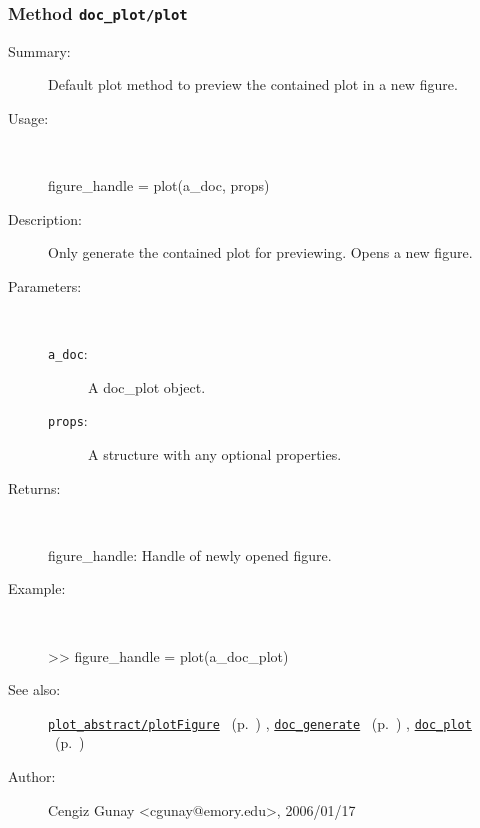 \subsubsection[Method \texttt{plot}]{Method \texttt{doc\_plot/plot}}%
%
\label{ref_doc_plot__plot}%
\hypertarget{ref_doc_plot__plot}{}%
\begin{description}
\item[Summary:]Default plot method to preview the contained plot in a new figure.
%
\item[Usage:]~%
\begin{lyxcode}%
figure\_handle = plot(a\_doc, props)
%
\end{lyxcode}%
%
\item[Description:]%
Only generate the contained plot for previewing. Opens a new figure.
\item[Parameters:]~
\begin{description}%
\item[\texttt{a\_doc}:]
 A doc\_plot object.
\item[\texttt{props}:]
 A structure with any optional properties.
\end{description}%
%
\item[Returns:
]~

	figure\_handle: Handle of newly opened figure.
%
\item[Example:]~
\begin{lyxcode}        >> figure\_handle = plot(a\_doc\_plot)
\\%
\end{lyxcode}
%
\item[See also:]%
\hyperlink{ref_plot_abstract__plotFigure}{\texttt{plot\_abstract/plotFigure}}%
\ (p.~\pageref{ref_plot_abstract__plotFigure})%
%
, \hyperlink{ref_doc_generate}{\texttt{doc\_generate}}%
\ (p.~\pageref{ref_doc_generate})%
%
, \hyperlink{ref_doc_plot}{\texttt{doc\_plot}}%
\ (p.~\pageref{ref_doc_plot})%
%
%
\item[Author:]%
Cengiz Gunay <cgunay@emory.edu>, 2006/01/17
%
\end{description}
\methodline%
